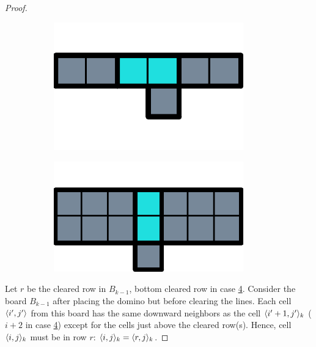 \begin{proof}
\begin{figure}[ht]
\begin{subfigure}[b]{0.15\textwidth}
    \caption{\label{dom:proff-floating:clear3}}
  \end{subfigure}
  \begin{subfigure}[b]{0.15\textwidth}
    \centering
    \includegraphics[width=0.9\textwidth]{./pictures/dominoes/proff-floating/clear-row-5.pdf}
    \caption{\label{dom:proff-floating:clear5}}
  \end{subfigure}
  \begin{subfigure}[b]{0.15\textwidth}
    \centering
    \includegraphics[width=0.9\textwidth]{./pictures/dominoes/proff-floating/clear-row-4.pdf}
    \caption{\label{dom:proff-floating:clear4}}
  \end{subfigure}
\end{figure}


  Let $r$ be the cleared row in \( B_{k-1} \), bottom cleared row in case \ref{dom:proff-floating:clear4}. Consider the board $B_{k-1}$ after placing the domino but before clearing the lines. Each cell $\cell[i'][j']$ from this board has the same downward neighbors as the cell $\cell[i'+1][j']_k$ ($i+2$ in case \ref{dom:proff-floating:clear4}) except for the cells just above the cleared row(s). Hence, cell \(\cell_k \) must be in row $r$: \( \cell_k = \cell[r]_k \).


\end{proof}
